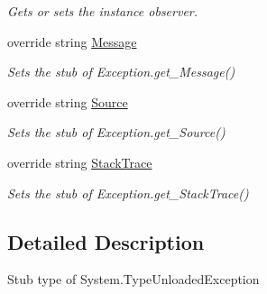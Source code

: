 \begin{DoxyCompactItemize}
\begin{DoxyCompactList}\small\item\em Gets or sets the instance observer.\end{DoxyCompactList}\item 
override string \hyperlink{class_system_1_1_fakes_1_1_stub_type_unloaded_exception_a3d444073e12588720c9c191dd832943f}{Message}
\begin{DoxyCompactList}\small\item\em Sets the stub of Exception.\-get\-\_\-\-Message()\end{DoxyCompactList}\item 
override string \hyperlink{class_system_1_1_fakes_1_1_stub_type_unloaded_exception_aae3dc11216e4281b4cafc36dbb5bff72}{Source}
\begin{DoxyCompactList}\small\item\em Sets the stub of Exception.\-get\-\_\-\-Source()\end{DoxyCompactList}\item 
override string \hyperlink{class_system_1_1_fakes_1_1_stub_type_unloaded_exception_ac5d6e4421d8a2dff6b22fe031b28e341}{Stack\-Trace}
\begin{DoxyCompactList}\small\item\em Sets the stub of Exception.\-get\-\_\-\-Stack\-Trace()\end{DoxyCompactList}\end{DoxyCompactItemize}


\subsection{Detailed Description}
Stub type of System.\-Type\-Unloaded\-Exception



